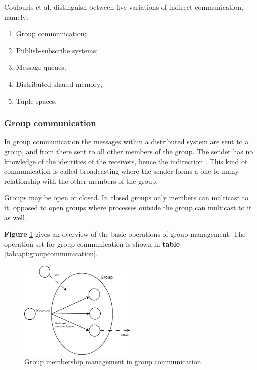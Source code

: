 Coulouris et al. distinguish between five variations of indirect communication, namely:
\begin{enumerate}
	\item Group communication;
	\item Publish-subscribe systems;
	\item Message queues;
	\item Distributed shared memory;
	\item Tuple spaces.
\end{enumerate}


\subsubsection{Group communication}

In group communication the messages within a distributed system are sent to a group, and from there sent to all other members of the group. The sender has no knowledge of the identities of the receivers, hence the indirection \cite{Coulouris:2011:DSC:2029110}. This kind of communication is called broadcasting where the sender forms a one-to-many relationship with the other members of the group.

Groups may be open or closed. In closed groups only members can multicast to it, opposed to open groups where processes outside the group can multicast to it as well.

\textbf{Figure} \ref{fig:groupcommunication} gives an overview of the basic operations of group management. The operation set for group communication is shown in \textbf{table} \ref{tab:api:groupcommunication}.


\begin{figure}
	\begin{center}
		\includegraphics[width=0.5\textwidth]{img/systems-and-architectures/groupcommunication}
	\end{center}
	\caption{Group membership management in group communication.}
	\label{fig:groupcommunication}
\end{figure}

